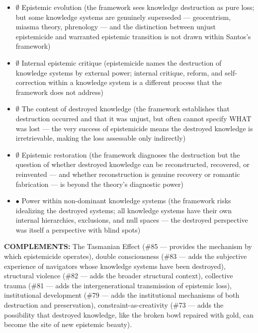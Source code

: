 \begin{itemize}[nosep,leftmargin=*]
  \item $\emptyset$ Epistemic evolution (the framework sees knowledge destruction as pure loss; but some knowledge systems are genuinely superseded — geocentrism, miasma theory, phrenology — and the distinction between unjust epistemicide and warranted epistemic transition is not drawn within Santos's framework)
  \item $\emptyset$ Internal epistemic critique (epistemicide names the destruction of knowledge systems by external power; internal critique, reform, and self-correction within a knowledge system is a different process that the framework does not address)
  \item $\emptyset$ The content of destroyed knowledge (the framework establishes that destruction occurred and that it was unjust, but often cannot specify WHAT was lost — the very success of epistemicide means the destroyed knowledge is irretrievable, making the loss assessable only indirectly)
  \item $\emptyset$ Epistemic restoration (the framework diagnoses the destruction but the question of whether destroyed knowledge can be reconstructed, recovered, or reinvented — and whether reconstruction is genuine recovery or romantic fabrication — is beyond the theory's diagnostic power)
  \item $\bullet$ Power within non-dominant knowledge systems (the framework risks idealizing the destroyed systems; all knowledge systems have their own internal hierarchies, exclusions, and null spaces — the destroyed perspective was itself a perspective with blind spots)
\end{itemize}


\textbf{COMPLEMENTS:} The Tasmanian Effect (\#85 — provides the mechanism by which epistemicide operates), double consciousness (\#83 — adds the subjective experience of navigators whose knowledge systems have been destroyed), structural violence (\#82 — adds the broader structural context), collective trauma (\#81 — adds the intergenerational transmission of epistemic loss), institutional development (\#79 — adds the institutional mechanisms of both destruction and preservation), constraint-as-creativity (\#73 — adds the possibility that destroyed knowledge, like the broken bowl repaired with gold, can become the site of new epistemic beauty).



